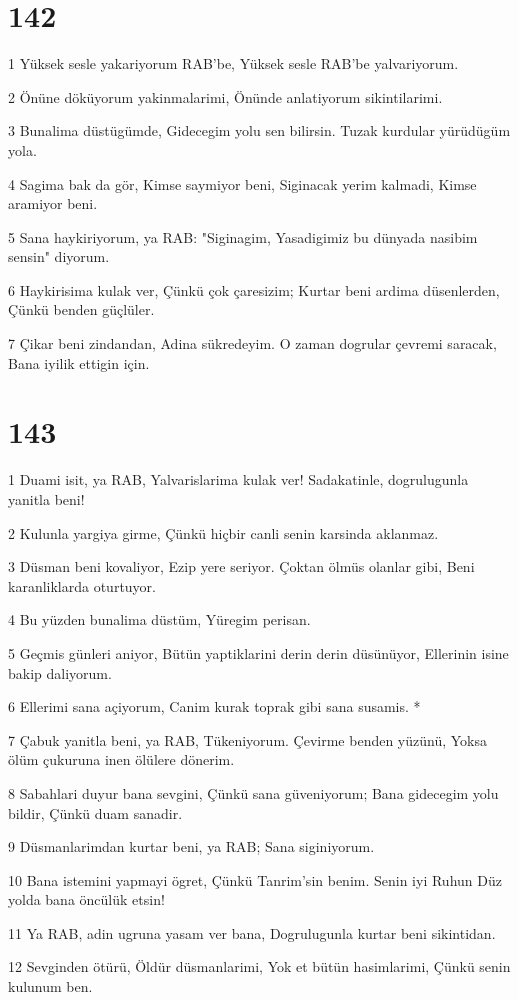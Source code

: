 \chapter{142}

\par 1 Yüksek sesle yakariyorum RAB'be, Yüksek sesle RAB'be yalvariyorum.
\par 2 Önüne döküyorum yakinmalarimi, Önünde anlatiyorum sikintilarimi.
\par 3 Bunalima düstügümde, Gidecegim yolu sen bilirsin. Tuzak kurdular yürüdügüm yola.
\par 4 Sagima bak da gör, Kimse saymiyor beni, Siginacak yerim kalmadi, Kimse aramiyor beni.
\par 5 Sana haykiriyorum, ya RAB: "Siginagim, Yasadigimiz bu dünyada nasibim sensin" diyorum.
\par 6 Haykirisima kulak ver, Çünkü çok çaresizim; Kurtar beni ardima düsenlerden, Çünkü benden güçlüler.
\par 7 Çikar beni zindandan, Adina sükredeyim. O zaman dogrular çevremi saracak, Bana iyilik ettigin için.

\chapter{143}

\par 1 Duami isit, ya RAB, Yalvarislarima kulak ver! Sadakatinle, dogrulugunla yanitla beni!
\par 2 Kulunla yargiya girme, Çünkü hiçbir canli senin karsinda aklanmaz.
\par 3 Düsman beni kovaliyor, Ezip yere seriyor. Çoktan ölmüs olanlar gibi, Beni karanliklarda oturtuyor.
\par 4 Bu yüzden bunalima düstüm, Yüregim perisan.
\par 5 Geçmis günleri aniyor, Bütün yaptiklarini derin derin düsünüyor, Ellerinin isine bakip daliyorum.
\par 6 Ellerimi sana açiyorum, Canim kurak toprak gibi sana susamis. *
\par 7 Çabuk yanitla beni, ya RAB, Tükeniyorum. Çevirme benden yüzünü, Yoksa ölüm çukuruna inen ölülere dönerim.
\par 8 Sabahlari duyur bana sevgini, Çünkü sana güveniyorum; Bana gidecegim yolu bildir, Çünkü duam sanadir.
\par 9 Düsmanlarimdan kurtar beni, ya RAB; Sana siginiyorum.
\par 10 Bana istemini yapmayi ögret, Çünkü Tanrim'sin benim. Senin iyi Ruhun Düz yolda bana öncülük etsin!
\par 11 Ya RAB, adin ugruna yasam ver bana, Dogrulugunla kurtar beni sikintidan.
\par 12 Sevginden ötürü, Öldür düsmanlarimi, Yok et bütün hasimlarimi, Çünkü senin kulunum ben.

